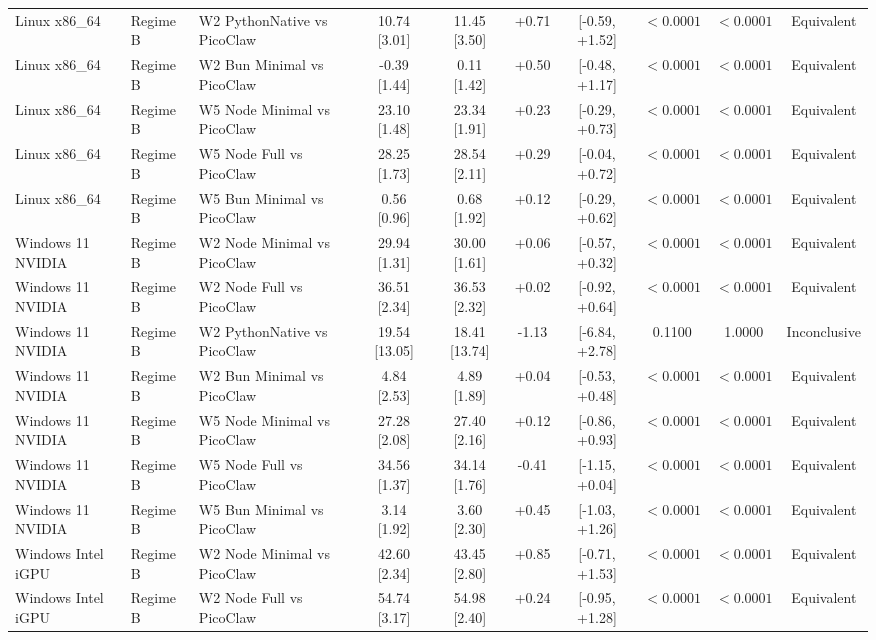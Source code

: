 \begin{table}[t]
{\begin{tabular}{lllccccccc}
Linux x86\_64 & Regime B & W2 PythonNative vs PicoClaw & 10.74 [3.01] & 11.45 [3.50] & +0.71 & [-0.59, +1.52] & $< 0.0001$ & $< 0.0001$ & Equivalent \\
Linux x86\_64 & Regime B & W2 Bun Minimal vs PicoClaw & -0.39 [1.44] & 0.11 [1.42] & +0.50 & [-0.48, +1.17] & $< 0.0001$ & $< 0.0001$ & Equivalent \\
Linux x86\_64 & Regime B & W5 Node Minimal vs PicoClaw & 23.10 [1.48] & 23.34 [1.91] & +0.23 & [-0.29, +0.73] & $< 0.0001$ & $< 0.0001$ & Equivalent \\
Linux x86\_64 & Regime B & W5 Node Full vs PicoClaw & 28.25 [1.73] & 28.54 [2.11] & +0.29 & [-0.04, +0.72] & $< 0.0001$ & $< 0.0001$ & Equivalent \\
Linux x86\_64 & Regime B & W5 Bun Minimal vs PicoClaw & 0.56 [0.96] & 0.68 [1.92] & +0.12 & [-0.29, +0.62] & $< 0.0001$ & $< 0.0001$ & Equivalent \\
Windows 11 NVIDIA & Regime B & W2 Node Minimal vs PicoClaw & 29.94 [1.31] & 30.00 [1.61] & +0.06 & [-0.57, +0.32] & $< 0.0001$ & $< 0.0001$ & Equivalent \\
Windows 11 NVIDIA & Regime B & W2 Node Full vs PicoClaw & 36.51 [2.34] & 36.53 [2.32] & +0.02 & [-0.92, +0.64] & $< 0.0001$ & $< 0.0001$ & Equivalent \\
Windows 11 NVIDIA & Regime B & W2 PythonNative vs PicoClaw & 19.54 [13.05] & 18.41 [13.74] & -1.13 & [-6.84, +2.78] & 0.1100 & 1.0000 & Inconclusive \\
Windows 11 NVIDIA & Regime B & W2 Bun Minimal vs PicoClaw & 4.84 [2.53] & 4.89 [1.89] & +0.04 & [-0.53, +0.48] & $< 0.0001$ & $< 0.0001$ & Equivalent \\
Windows 11 NVIDIA & Regime B & W5 Node Minimal vs PicoClaw & 27.28 [2.08] & 27.40 [2.16] & +0.12 & [-0.86, +0.93] & $< 0.0001$ & $< 0.0001$ & Equivalent \\
Windows 11 NVIDIA & Regime B & W5 Node Full vs PicoClaw & 34.56 [1.37] & 34.14 [1.76] & -0.41 & [-1.15, +0.04] & $< 0.0001$ & $< 0.0001$ & Equivalent \\
Windows 11 NVIDIA & Regime B & W5 Bun Minimal vs PicoClaw & 3.14 [1.92] & 3.60 [2.30] & +0.45 & [-1.03, +1.26] & $< 0.0001$ & $< 0.0001$ & Equivalent \\
Windows Intel iGPU & Regime B & W2 Node Minimal vs PicoClaw & 42.60 [2.34] & 43.45 [2.80] & +0.85 & [-0.71, +1.53] & $< 0.0001$ & $< 0.0001$ & Equivalent \\
Windows Intel iGPU & Regime B & W2 Node Full vs PicoClaw & 54.74 [3.17] & 54.98 [2.40] & +0.24 & [-0.95, +1.28] & $< 0.0001$ & $< 0.0001$ & Equivalent \\

\end{tabular}}
\end{table}
